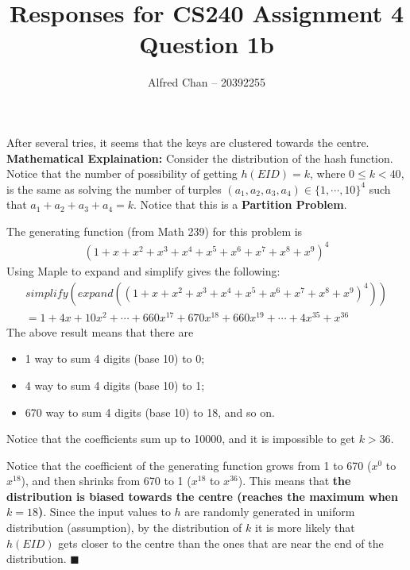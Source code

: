 \documentclass[12pt]{article}
\title{Responses for CS240 Assignment 4 Question 1b}
\author{Alfred Chan -- 20392255}
\begin{document}
\maketitle
After several tries, it seems that the keys are clustered towards the centre.\\

{\bf Mathematical Explaination:} Consider the distribution of the hash function.
Notice that the number of possibility of getting $h(EID) = k$,
where $0 \le k < 40$, is the same as solving the number of turples 
	$(a_1,a_2,a_3,a_4) \in \{1, \cdots, 10\}^4$ such that $a_1 + a_2 + a_3 + a_4 = k$.
Notice that this is a {\bf Partition Problem}.

The generating function (from Math 239) for this problem is
\begin{align}
(1+x+x^2+x^3+x^4+x^5+x^6+x^7+x^8+x^9)^4
\end{align}
Using Maple to expand and simplify gives the following:
\begin{gather*}
simplify(expand((1+x+x^2+x^3+x^4+x^5+x^6+x^7+x^8+x^9)^4))\\
= 1+4x+10x^2+ \cdots
	+ 660x^{17} + 670x^{18} + 660x^{19} + \cdots
	+ 4x^{35} + x^{36}
\end{gather*}
The above result means that there are
\begin{itemize}
\item 1 way to sum 4 digits (base 10) to 0;
\item 4 way to sum 4 digits (base 10) to 1;
\item 670 way to sum 4 digits (base 10) to 18, and so on.
\end{itemize}
Notice that the coefficients sum up to 10000, and it is impossible to get $k > 36$.

Notice that the coefficient of the generating function
	grows from 1 to 670 ($x^{0}$ to $x^{18}$),
	and then shrinks from 670 to 1 ($x^{18}$ to $x^{36}$).
This means that {\bf the distribution is biased towards the centre (reaches the maximum when $k=18$)}.
Since the input values to $h$ are randomly generated in uniform distribution (assumption),
by the distribution of $k$ it is more likely that $h(EID)$ gets closer to the centre than the ones that are near the end of the distribution.
\hfill $\blacksquare$
\end{document}
